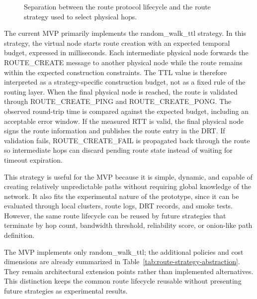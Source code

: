 \documentclass[12pt,a4paper]{article}
\newcommand{\codebreak}[1]{{\footnotesize\ttfamily #1}}
\begin{document}
\begin{figure}[H]
{%
}
\caption{Separation between the route protocol lifecycle and the route strategy used to select physical hops.}
\label{fig:route-strategy-abstraction}
\end{figure}

The current MVP primarily implements the \codebreak{random\_\allowbreak{}walk\_\allowbreak{}ttl} strategy. In this strategy, the virtual node starts route creation with an expected temporal budget, expressed in milliseconds. Each intermediate physical node forwards the \codebreak{ROUTE\_\allowbreak{}CREATE} message to another physical node while the route remains within the expected construction constraints. The TTL value is therefore interpreted as a strategy-specific construction budget, not as a fixed rule of the routing layer. When the final physical node is reached, the route is validated through \codebreak{ROUTE\_\allowbreak{}CREATE\_\allowbreak{}PING} and \codebreak{ROUTE\_\allowbreak{}CREATE\_\allowbreak{}PONG}. The observed round-trip time is compared against the expected budget, including an acceptable error window. If the measured RTT is valid, the final physical node signs the route information and publishes the route entry in the DRT. If validation fails, \codebreak{ROUTE\_\allowbreak{}CREATE\_\allowbreak{}FAIL} is propagated back through the route so intermediate hops can discard pending route state instead of waiting for timeout expiration.

This strategy is useful for the MVP because it is simple, dynamic, and capable of creating relatively unpredictable paths without requiring global knowledge of the network. It also fits the experimental nature of the prototype, since it can be evaluated through local clusters, route logs, DRT records, and smoke tests. However, the same route lifecycle can be reused by future strategies that terminate by hop count, bandwidth threshold, reliability score, or onion-like path definition.

The MVP implements only \codebreak{random\_\allowbreak{}walk\_\allowbreak{}ttl}; the additional policies and cost dimensions are already summarized in Table~\ref{tab:route-strategy-abstraction}. They remain architectural extension points rather than implemented alternatives. This distinction keeps the common route lifecycle reusable without presenting future strategies as experimental results.
\end{document}
